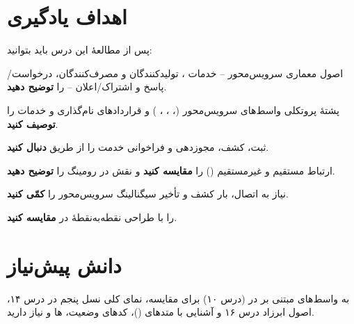 \documentclass[11pt,a4paper]{article}
\begin{document}
\ACNcover

\section{اهداف یادگیری}
پس از مطالعهٔ این درس باید بتوانید:
\begin{objectives}
  \item اصول معماری سرویس‌محور -- خدمات ، تولیدکنندگان و مصرف‌کنندگان، درخواست/پاسخ و اشتراک/اعلان -- را
        \textbf{توضیح دهید}.
  \item پشتهٔ پروتکلی واسط‌های سرویس‌محور (، ، ، ) و قراردادهای نام‌گذاری و
         خدمات  را \textbf{توصیف کنید}.
  \item ثبت، کشف، مجوزدهی و فراخوانی خدمت را از طریق  \textbf{دنبال کنید}.
  \item ارتباط مستقیم و غیرمستقیم () را \textbf{مقایسه کنید} و نقش  در رومینگ را \textbf{توضیح دهید}.
  \item نیاز به اتصال، بار کشف و تأخیر سیگنالینگ سرویس‌محور را \textbf{کمّی کنید}.
  \item {} را با طراحی نقطه‌به‌نقطهٔ  در  \textbf{مقایسه کنید}.
\end{objectives}

\section{دانش پیش‌نیاز}
به واسط‌های مبتنی بر  در  (درس ۱۰) برای مقایسه، نمای کلی نسل پنجم در درس ۱۴، اصول ابرزاد درس ۱۶ و
آشنایی با متدهای  ()، کدهای وضعیت، ها و  نیاز دارید.
\end{document}
